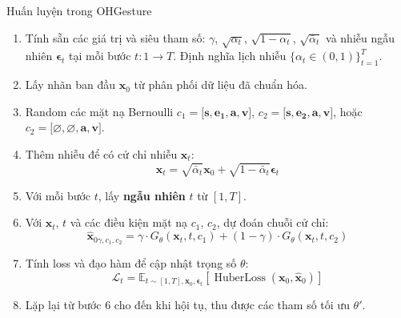 \begin{algorithm}[H]
	\caption{Huấn luyện trong OHGesture}
	\label{alg:trainingohgesture}
	\setlength{\baselineskip}{10pt}
	\begin{enumerate}
		\item Tính sẵn các giá trị và siêu tham số: $\gamma$, $\sqrt{\alpha_t}$, $\sqrt{1 - \alpha_t}$, $\sqrt{\bar{\alpha}_t}$ và nhiễu ngẫu nhiên $\boldsymbol{\epsilon}_t$ tại mỗi bước $t: 1 \rightarrow T$. Định nghĩa lịch nhiễu $\{\alpha_t \in (0, 1)\}_{t=1}^T$.
		
		\item Lấy nhãn ban đầu $\mathbf{x}_0$ từ phân phối dữ liệu đã chuẩn hóa.
		
		\item Random các mặt nạ Bernoulli $c_{1} = \big[ \mathbf{s}, \mathbf{e_1}, \mathbf{a}, \mathbf{v} \big]$, $c_{2} = \big[ \mathbf{s}, \mathbf{e_2}, \mathbf{a}, \mathbf{v} \big]$, hoặc $c_{2} = \big[ \varnothing, \varnothing, \mathbf{a}, \mathbf{v} \big]$.
		
		\item Thêm nhiễu để có cử chỉ nhiễu $\mathbf{x}_t$:
		\[
		\mathbf{x}_t = \sqrt{\bar{\alpha}_t} \mathbf{x}_0 + \sqrt{1 - \bar{\alpha}_t} \boldsymbol{\epsilon}_t
		\]
		
		\item Với mỗi bước $t$, lấy \textbf{ngẫu nhiên} $t$ từ $[1, T]$.
		
		\item Với $\mathbf{x}_t$, $t$ và các điều kiện mặt nạ $c_1$, $c_2$, dự đoán chuỗi cử chỉ:
		\[
		\hat{\mathbf{x}}_{0 \gamma, c_{1}, c_{2}} = \gamma \cdot G_{\theta} \left(\mathbf{x}_{t}, t, c_{1}\right) + (1 - \gamma) \cdot G_{\theta} \left(\mathbf{x}_{t}, t, c_{2}\right)
		\]
		
		\item Tính loss và đạo hàm để cập nhật trọng số $\theta$:
		\[
		\mathcal{L}_t = \mathbb{E}_{t \sim [1, T], \mathbf{x}_0, \boldsymbol{\epsilon}_t} \left[ \operatorname{HuberLoss}(\mathbf{x}_0, \hat{\mathbf{x}}_0 ) \right]
		\]
		
		\item Lặp lại từ bước 6 cho đến khi hội tụ, thu được các tham số tối ưu $\theta'$.
	\end{enumerate}
\end{algorithm}


